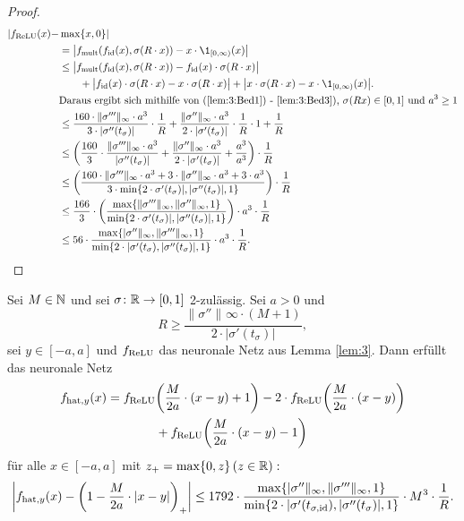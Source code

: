\begin{proof}
\begin{equation*}
\begin{split}
|f_{\ReLU}(x) - & \max\{x, 0\}|  \\
& = \big| f_{\mult}(f_{\id}(x), \sigma(R \cdot x)) - x \cdot \1_{[0, \infty)}(x)\big| \\
& \leq \big| f_{\mult}(f_{\id}(x), \sigma(R \cdot x)) - f_{\id}(x)\cdot\sigma(R \cdot x)\big| \\
& \qquad + \big| f_{\id}(x)\cdot\sigma(R \cdot x) - x \cdot \sigma(R \cdot x)\big| + \big| x \cdot \sigma(R \cdot x) - x \cdot \1_{[0, \infty)}(x)\big|. \\
& \text{Daraus ergibt sich mithilfe von (\ref{lem:3:Bed1}) - \ref{lem:3:Bed3}), $\sigma(Rx) \in [0, 1]$ und $a^3 \geq 1$}\\
& \leq \frac{160 \cdot \|\sigma'''\|_{\infty} \cdot a ^3}{3 \cdot |\sigma''(t_{\sigma})|} \cdot \frac{1}{R} + \frac{\|\sigma''\|_{\infty} \cdot a^3}{2 \cdot |\sigma'(t_{\sigma})|} \cdot \frac{1}{R} \cdot 1+ \frac{1}{R} \\
& \leq \bigg(\frac{160}{3} \cdot \frac{\|\sigma'''\|_{\infty} \cdot a ^3}{|\sigma''(t_{\sigma})|} + \frac{\|\sigma''\|_{\infty} \cdot a^3}{2 \cdot |\sigma'(t_{\sigma})|} + \frac{a^3}{a^3} \bigg) \cdot \frac{1}{R} \\ 
& \leq \bigg(\frac{160 \cdot\|\sigma'''\|_{\infty} \cdot a ^3 + 3 \cdot \|\sigma''\|_{\infty} \cdot a^3 + 3 \cdot a^3}{3 \cdot \min\{ 2 \cdot \sigma'(t_{\sigma})|, |\sigma''(t_{\sigma})|, 1\}}\bigg) \cdot \frac{1}{R}\\
& \leq \frac{166}{3} \cdot \bigg(\frac{\max\{\|\sigma'''\|_{\infty}, \|\sigma''\|_{\infty} , 1\}}{\min\{ 2 \cdot \sigma'(t_{\sigma})|, |\sigma''(t_{\sigma})|, 1\}}\bigg) \cdot a^3 \cdot  \frac{1}{R} \\
& \leq 56 \cdot \frac{\max\{|\sigma''\|_{\infty}, \|\sigma'''\|_{\infty}, 1\}}{\min\{2 \cdot |\sigma'(t_{\sigma}), |\sigma''(t_{\sigma})|, 1\}} \cdot a^3 \cdot \frac{1}{R}.
\end{split}
\end{equation*}
  \end{proof}
  \begin{lem}
  \label{lem:4}
  Sei $M \in \mathbb{N}$ und sei $\sigma\colon \mathbb{R} \to [0, 1]$ 2-zulässig. Sei $a > 0$ und $$R \geq \frac{\|\sigma''\|_{}\infty \cdot (M + 1)}{2 \cdot |\sigma'(t_{\sigma})|},$$ sei $y \in [-a, a]$ und $f_{\mathrm{ReLU}}$ das neuronale Netz aus Lemma \ref{lem:3}. Dann erfüllt das neuronale Netz 
  \begin{equation*}
  \begin{split}
  f_{\mathrm{hat},y}(x) = f_{\mathrm{ReLU}}& \bigg(\frac{M}{2a} \cdot (x - y) + 1\bigg) - 2 \cdot f_{\mathrm{ReLU}}\bigg(\frac{M}{2a} \cdot (x - y)\bigg) \\ &+ f_{\mathrm{ReLU}}\bigg(\frac{M}{2a} \cdot (x - y) - 1\bigg)
  \end{split}
  \end{equation*}
  für alle $x \in [-a ,a]$ mit $z_+ = \max\{0, z\} \, (z \in \mathbb{R}):$   
  $$\bigg|f_{\mathrm{hat},y}(x) - \bigg(1 - \frac{M}{2a} \cdot |x - y|\bigg)_+\bigg| \leq 1792 \cdot \frac{\max\{|\sigma''\|_{\infty}, \|\sigma'''\|_{\infty}, 1\}}{\min\{2 \cdot |\sigma'(t_{\sigma, \mathrm{id}}), |\sigma''(t_{\sigma})|, 1\}} \cdot M^3 \cdot \frac{1}{R}.$$
  \end{lem}
